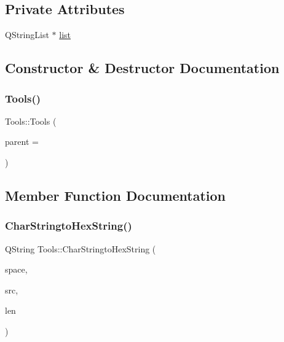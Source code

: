 \subsection*{Private Attributes}
\begin{DoxyCompactItemize}
\item 
Q\+String\+List $\ast$ \mbox{\hyperlink{class_tools_a2d01c59dccd50660c98f9ad7ee13f5d0}{list}}
\end{DoxyCompactItemize}


\subsection{Constructor \& Destructor Documentation}
\mbox{\label{class_tools_a812eaff6fdce0fe489279f72c06e83e3}} 
\subsubsection{\texorpdfstring{Tools()}{Tools()}}
{\footnotesize\ttfamily Tools\+::\+Tools (\begin{DoxyParamCaption}\item[{Q\+Object $\ast$}]{parent = {} }\end{DoxyParamCaption})\hspace{0.3cm}{\ttfamily [explicit]}}



\subsection{Member Function Documentation}
\mbox{\label{class_tools_a89da3511a27330d893d495ddc6160a91}} 
\subsubsection{\texorpdfstring{CharStringtoHexString()}{CharStringtoHexString()}\hspace{0.1cm}{\footnotesize\ttfamily [1/2]}}
{\footnotesize\ttfamily Q\+String Tools\+::\+Char\+Stringto\+Hex\+String (\begin{DoxyParamCaption}\item[{Q\+String}]{space,  }\item[{const char $\ast$}]{src,  }\item[{int}]{len }\end{DoxyParamCaption})}



